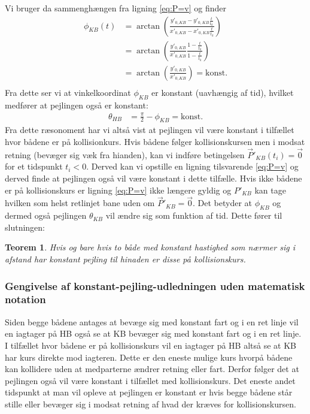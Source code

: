 \documentclass[%
 reprint,
nofootinbib,
aps,
]{revtex4-1}
\newtheorem{theorem}{Teorem}
\begin{document}
Vi bruger da sammenghængen fra ligning \ref{eq:P=v} og finder
\begin{align*}
  \phi_{KB}(t) &= \arctan{\left( \frac{y'_{0,KB} - y'_{0,KB}\frac{t}{t_k}}{x'_{0,KB} - x'_{0,KB}\frac{t}{t_k}}\right)} \\
  &= \arctan{\left(\frac{y'_{0,KB}}{x'_{0,KB}} \frac{1 - \frac{t}{t_k}}{1 - \frac{t}{t_k}}\right)} \\
  &= \arctan{\left(\frac{y'_{0,KB}}{x'_{0,KB}}\right)} = \text{konst.} \\
\end{align*}
Fra dette ser vi at vinkelkoordinat $\phi_{KB}$ er konstant (uavhængig af tid), hvilket medfører at pejlingen også er konstant:
\begin{align*}
  \theta_{HB} &= \frac{\pi}{2} - \phi_{KB} = \text{konst.}
\end{align*}
Fra dette ræsonoment har vi altså vist at pejlingen vil være konstant i tilfællet hvor bådene er på kollisionkurs. Hvis bådene følger kollisionskursen men i modsat retning (bevæger sig væk fra hianden), kan vi indføre betingelsen $\vec{P}'_{KB}(t_i) = \vec{0}$ for et tidspunkt $t_i < 0$. Derved kan vi opstille en ligning tilsvarende \ref{eq:P=v} og derved finde at pejlingen også vil være konstant i dette tilfælle. Hvis ikke bådene er på kollisionskurs er ligning \ref{eq:P=v} ikke længere gyldig og $P'_{KB}$ kan tage hvilken som helst retlinjet bane uden om $\vec{P}'_{KB} = \vec{0}$. Det betyder at $\phi_{KB}$ og dermed også pejlingen $\theta_{KB}$ vil ændre sig som funktion af tid. Dette fører til slutningen:
\begin{theorem}
  Hvis og bare hvis to både med konstant hastighed som nærmer sig i afstand har konstant pejling til hinaden er disse på kollisionskurs.
  \label{Teo:pejling}
\end{theorem}
\subsubsection{Gengivelse af konstant-pejling-udledningen uden matematisk notation}
Siden begge bådene antages at bevæge sig med konstant fart og i en ret linje vil en iagtager på HB også se at KB bevæger sig med konstant fart og i en ret linje. I tilfællet hvor bådene er på kollisionskurs vil en iagtager på HB altså se at KB har kurs direkte mod iagteren. Dette er den eneste mulige kurs hvorpå bådene kan kollidere uden at medparterne ændrer retning eller fart. Derfor følger det at pejlingen også vil være konstant i tilfællet med kollisionskurs. Det eneste andet tidspunkt at man vil opleve at pejlingen er konstant er hvis begge bådene står stille eller bevæger sig i modsat retning af hvad der kræves for kollisionskursen.
\end{document}
